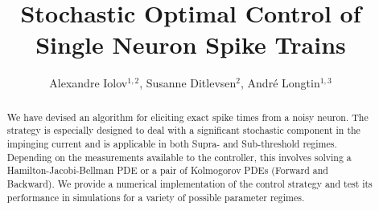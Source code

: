 \documentclass[12pt]{iopart}
\begin{document}
 


\title{Stochastic Optimal Control of Single Neuron Spike Trains}
\author{Alexandre Iolov$^{1,2}$, Susanne Ditlevsen$^2$, Andr\'e Longtin$^{1,3}$ 
		}	
\address{%
     (1) Department of Mathematics and Statistics, University of Ottawa, Ottawa,
    Canada
\\
    (2) Department of Mathematical Sciences, University of Copenhagen,
Copenhagen, Denmark
\\
    (3) Department of Physics, University of Ottawa,
    Ottawa, Canada
}


\begin{abstract}
We have devised an algorithm for eliciting exact spike times from a noisy
neuron. The strategy is especially designed to deal with a significant
stochastic component in the impinging current and is applicable in both
Supra- and Sub-threshold regimes. Depending on the measurements available to
the controller, this involves solving a Hamilton-Jacobi-Bellman PDE or a pair of
Kolmogorov PDEs (Forward and Backward). We provide a numerical implementation of
the control strategy and test its performance in simulations for a variety of
possible parameter regimes. 

\end{abstract}

\maketitle
\end{document}
